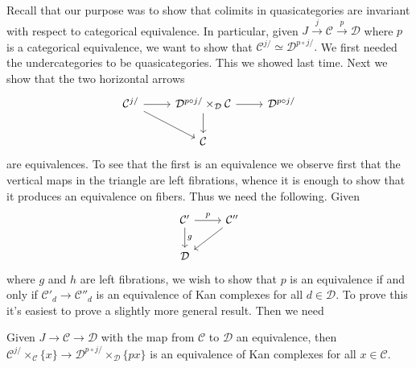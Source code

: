 \documentclass{amsart}
\begin{document}
Recall that our purpose was to show that colimits in quasicategories are invariant
with respect to categorical equivalence. In particular, given $J\xrightarrow{j}\mathcal{C}\xrightarrow{p}\mathcal{D}$
where $p$ is a categorical equivalence, we want to show that $\mathcal{C}^{j/}\simeq \mathcal{D}^{p\circ j/}.$
We first needed the undercategories to be quasicategories. This we showed last time.
Next we show that the two horizontal arrows
\begin{equation*}
    \begin{tikzcd}
        \mathcal{C}^{j/} \rar\ar[dr] & \mathcal{D}^{p\circ j/}\times_\mathcal{D}\mathcal{C} \rar\dar & \mathcal{D}^{p\circ j/}\\
        & \mathcal{C}
    \end{tikzcd}
\end{equation*}
are equivalences. To see that the first is an equivalence we observe first
that the vertical maps in the triangle are left fibrations, whence it is
enough to show that it produces an equivalence on fibers. Thus we need
the following. Given
\begin{equation*}
    \begin{tikzcd}
        \mathcal{C'}\dar{g}\rar{p} & \mathcal{C}''\ar[dl]{h}\\
        \mathcal{D}
    \end{tikzcd}
\end{equation*}
where $g$ and $h$ are left fibrations, we wish to show that $p$ is an equivalence
if and only if $\mathcal{C}'_d\to \mathcal{C}''_d$ is an equivalence of Kan
complexes for all $d\in\mathcal{D}$. To prove this it's easiest to prove a slightly
more general result. Then we need
\begin{lemma}[HTT 2.5.4.1]
    Given $J\to \mathcal{C}\to \mathcal{D}$ with the map from $\mathcal{C}$ to $\mathcal{D}$
    an equivalence, then $\mathcal{C}^{j/}\times_\mathcal{C}\{x\}\to\mathcal{D}^{p\circ j/}\times_\mathcal{D}\{px\}$
    is an equivalence of Kan complexes for all $x\in \mathcal{C}$.
\end{lemma}
\end{document}
